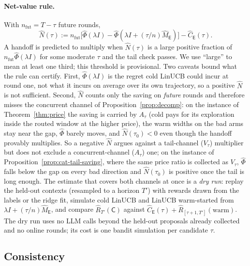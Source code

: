 \documentclass{article}
\theoremstyle{definition}
\theoremstyle{remark}
\theoremstyle{remark}
\newcommand{\Cold}{\mathsf{C}}
\newcommand{\Exp}{\mathsf{E}}
\begin{document}
\paragraph{Net-value rule.} With $n_{\mathrm{fut}}=T-\tau$ future rounds,
\[
\widehat N(\tau):=n_{\mathrm{fut}}\bigl[\widehat\Phi(\lambda I)-\widehat\Phi(\lambda I+(\tau/n)\widehat M_{\Exp})\bigr]-\widehat C_{\Exp}(\tau).
\]
A handoff is predicted to multiply when $\widehat N(\tau)$ is a large
positive fraction of $n_{\mathrm{fut}}\widehat\Phi(\lambda I)$ for some
moderate $\tau$ and the tail check passes. We use ``large'' to mean at least
one third; this threshold is provisional. Two caveats bound what the rule
can certify. First, $\widehat\Phi(\lambda I)$ is the regret cold LinUCB could
incur at round one, not what it incurs on average over its own trajectory,
so a positive $\widehat N$ is not sufficient. Second, $\widehat N$ counts only
the saving on \emph{future} rounds and therefore misses the concurrent
channel of Proposition~\ref{prop:decomp}: on the instance of
Theorem~\ref{thm:price} the saving is carried by $A_\tau$ (cold pays for its
exploration inside the routed window at the higher price), the warm widths on
the bad arms stay near the gap, $\widehat\Phi$ barely moves, and
$\widehat N(\tau_0)<0$ even though the handoff provably multiplies. So a
negative $\widehat N$ argues against a tail-channel ($V_\tau$) multiplier but
does not exclude a concurrent-channel ($A_\tau$) one; on the instance of
Proposition~\ref{prop:cat-tail-saving}, where the same price ratio is
collected as $V_\tau$, $\widehat\Phi$ falls below the gap on every bad
direction and $\widehat N(\tau_0)$ is positive once the tail is long enough. The estimate that
covers both channels at once is a \emph{dry run}: replay the held-out
contexts (resampled to a horizon $T'$) with rewards drawn from the labels or
the ridge fit, simulate cold LinUCB and LinUCB warm-started from
$\lambda I+(\tau/n)\widehat M_{\Exp}$, and compare
$\widehat R_{T'}(\Cold)$ against
$\widehat C_{\Exp}(\tau)+\widehat R_{[\tau+1,T']}(\mathrm{warm})$. The dry run
uses no LLM calls beyond the held-out proposals already collected and no
online rounds; its cost is one bandit simulation per candidate $\tau$.

\subsection{Consistency}
\label{app:consistency}
\end{document}
